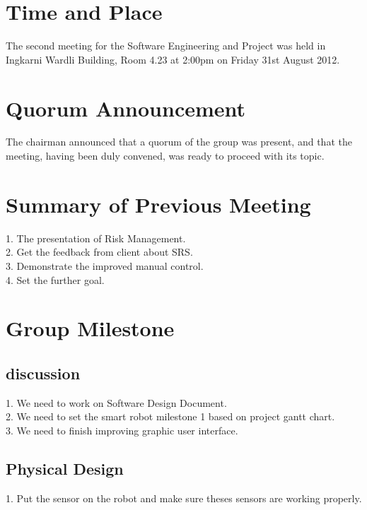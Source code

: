 \documentclass[11pt, a4paper]{article}
\begin{document}
\section{Time and Place}
The second meeting for the Software Engineering and Project was held in Ingkarni Wardli Building, Room 4.23 at 2:00pm on Friday 31st August 2012.

\section{Quorum Announcement}
The chairman announced that a quorum of the group was present, and that the meeting, having been duly convened, was ready to proceed with its topic.

\section{Summary of Previous Meeting}
1. The presentation of Risk Management.\\
2. Get the feedback from client about SRS. \\
3. Demonstrate the improved manual control.\\
4. Set the further goal.\\
 

\section{Group Milestone}

\subsection{discussion}
1. We need to work on Software Design Document.\\
2. We need to set the smart robot milestone 1 based on project gantt chart.\\
3. We need to finish improving graphic user interface.\\



\subsection{Physical Design}
1. Put the sensor on the robot and make sure theses sensors are working properly.
\end{document}
